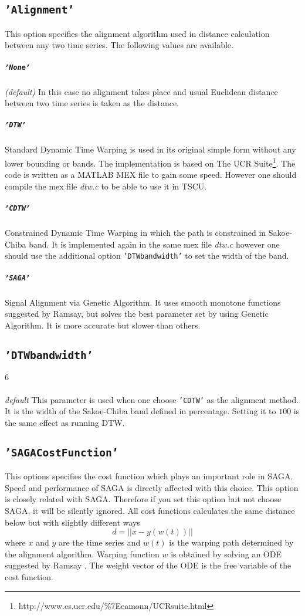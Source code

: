 \documentclass{article}
\begin{document}
\subsection{\texttt{'Alignment'}} 
This option specifies the alignment algorithm used in distance calculation between any two time series. The following values are available.

\subparagraph*{\texttt{'None'}} {\it (default)} In this case no alignment takes place and usual Euclidean distance between two time series is taken as the distance.

\subparagraph*{\texttt{'DTW'}} Standard Dynamic Time Warping is used in its original simple form without any lower bounding or bands. The implementation is based on The UCR Suite\footnote{http://www.cs.ucr.edu/\%7Eeamonn/UCRsuite.html}. The code is written as a MATLAB MEX file to gain some speed. However one should compile the mex file {\it dtw.c} to be able to use it in TSCU. 

\subparagraph*{\texttt{'CDTW'}} Constrained Dynamic Time Warping in which the path is constrained in Sakoe-Chiba band. It is implemented again in the same mex file {\it dtw.c} however one should use the additional option \texttt{'DTWbandwidth'} to set the width of the band.

\subparagraph*{\texttt{'SAGA'}} Signal Alignment via Genetic Algorithm. It uses smooth monotone functions suggested by Ramsay\cite{Ramsay1998}, but solves the best parameter set by using Genetic Algorithm\cite{Kaya2013113}. It is more accurate but slower than others.


 
\subsection{\texttt{'DTWbandwidth'}} 
\subparagraph*{$6$} {\it default} This parameter is used when one choose \texttt{'CDTW'} as the alignment method. It is the width of the Sakoe-Chiba band defined in percentage. Setting it to $100$ is the same effect as running DTW.

\subsection{\texttt{'SAGACostFunction'}} 
This options specifies the cost function which plays an important role in SAGA. Speed and performance of SAGA is directly affected with this choice. This option is closely related with SAGA. Therefore if you set this option but not choose SAGA, it will be silently ignored.
All cost functions calculates the same distance below but with slightly different ways  
$$ d = || x - y(w(t)) ||$$
where $x$ and $y$ are the time series and $w(t)$ is the warping path determined by the alignment algorithm. Warping function $w$ is obtained by solving an ODE suggested by Ramsay \cite{Ramsay1998}. The weight vector of the ODE is the free variable of the cost function. 
\end{document}
